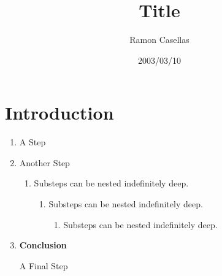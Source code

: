 \documentclass[pdftex,english,a4paper,10pt]{article}
\title{\textbf{Title}}
\date{2003/03/10}
\author{Ramon Casellas}
\begin{document}
{\maketitle\pagestyle{empty}\thispagestyle{empty}}

\section{Introduction}
\label{id174752}\hypertarget{id174752}{}%


{}
\begin{enumerate}

\item{ A Step }

\item{ Another Step \begin{enumerate}

\item{ Substeps can be nested indefinitely deep.  \begin{enumerate}

\item{ Substeps can be nested indefinitely deep.  \begin{enumerate}

\item{ Substeps can be nested indefinitely deep.  }
\end{enumerate}
}
\end{enumerate}
}
\end{enumerate}
}

\item{{\bf{Conclusion}}

    A Final Step
  }
\end{enumerate}

\end{document}

